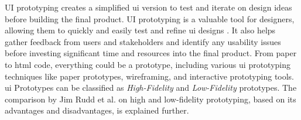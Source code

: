 UI prototyping creates a simplified \ac{ui} version to test and iterate on design ideas before building the final product.
UI prototyping is a valuable tool for designers, allowing them to quickly and easily test and refine \ac{ui} designs \cite{article:prototyping:gould}.
It also helps gather feedback from users and stakeholders \cite{misc:prorotypes:lauff} and identify any usability issues before investing significant time and resources into the final product.
From paper to \ac{html} code, everything could be a prototype, including various \ac{ui} prototyping techniques like paper prototypes, wireframing, and interactive prototyping tools.
\ac{ui} Prototypes can be classified as \textit{High-Fidelity} and \textit{Low-Fidelity} prototypes.
The comparison by Jim Rudd et al. \cite{article:prototyping:highlowfidelity} on high and low-fidelity prototyping, based on its advantages and disadvantages, is explained further.

